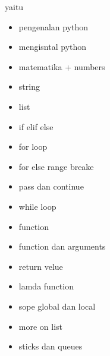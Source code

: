 {{{{{{{{{{{{{{\noindent 
yaitu \par
\vspace{\baselineskip}
\begin{itemize}
	\item pengenalan python
	\item mengisntal python
\item	matematika + numbers
\item	string
	\item list
\item	if elif else
\item	for loop
\item	for else range breake
\item	pass dan continue 
\item	while loop
\item	function
\item	function dan arguments
\item	return velue
\item	lamda function
\item	sope global dan local
\item	more on list
\item	sticks dan queues
	
\end{itemize}

}}}}}}}}}}}}}}
